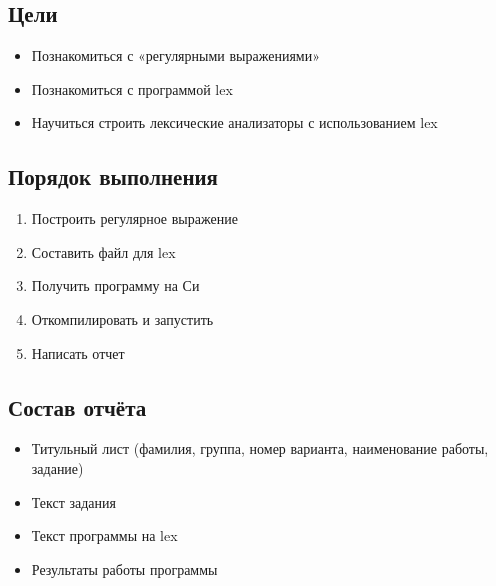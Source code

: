 \documentclass[a4paper,12pt]{article}
\begin{document}
\subsection{Цели}
\begin{itemize}
	\item Познакомиться с «регулярными выражениями»
	\item Познакомиться с программой lex
	\item Научиться строить лексические анализаторы с использованием lex
\end{itemize}

\subsection{Порядок выполнения}
\begin{enumerate}
	\item Построить регулярное выражение
	\item Составить файл для lex
	\item Получить программу на Си
	\item Откомпилировать и запустить
	\item Написать отчет
\end{enumerate}

\subsection{Состав отчёта}
\begin{itemize}
	\item Титульный лист (фамилия, группа, номер варианта, наименование работы, задание)
	\item Текст задания
	\item Текст программы на lex
	\item Результаты работы программы
\end{itemize}
\end{document}
